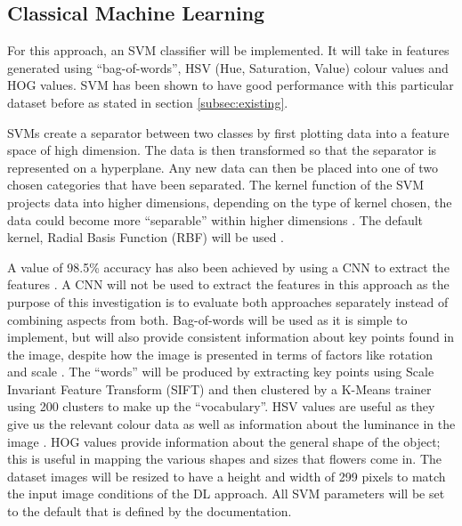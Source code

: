 \documentclass[12pt,a4paper]{report}
\begin{document}
\subsection{Classical Machine Learning}

For this approach, an SVM classifier will be implemented. It will take in features generated using 
“bag-of-words”, HSV (Hue, Saturation, Value) colour values and HOG values. SVM has been shown to have 
good performance with this particular dataset before as 
stated in section \ref{subsec:existing}.

\par

SVMs create a separator between two classes by first plotting data into a feature space of high dimension. The data is 
then transformed so that the separator is represented on a hyperplane. Any new data can then be placed into one of two 
chosen categories that have been separated. The kernel function of the SVM projects data into higher dimensions, 
depending on the type of kernel chosen, the data could become more “separable” within higher dimensions 
\citep{NobleWilliamS2006Wias}. The default kernel, Radial Basis Function (RBF) will be used \citep{sckikitsvm}. 

\par

A value of 98.5\% accuracy has also been achieved by using a CNN to extract the features 
\citep{mete}. A CNN will not be used to extract the features in this approach as the purpose of this investigation is to 
evaluate both 
approaches separately instead of combining aspects from both. Bag-of-words will be used as it is simple to implement, 
but will also provide consistent information about key points found in the image, despite how the image is presented in 
terms of factors like rotation and scale \citep{mohan}.
The “words” will be produced by extracting key points using Scale Invariant Feature
Transform (SIFT) and then clustered by a K-Means trainer using 200 clusters to make up the “vocabulary”. HSV values are 
useful as they give
us the relevant colour data as well as information about the 
luminance in the image \citep{chapelle1999support}. HOG values provide information about the general
shape of the object; this is useful in mapping the various shapes and sizes that flowers come in. The dataset images 
will be resized to have a height and width of 
299 pixels to match the input image conditions of the DL approach. All SVM parameters will be set to the 
default that is defined by the documentation.
\end{document}
